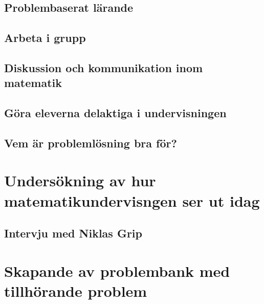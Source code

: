 \documentclass[11pt,a4paper]{article}
\begin{document}
    \subsection{Problembaserat lärande}
        
        
    \subsection{Arbeta i grupp}
        
        
    \subsection{Diskussion och kommunikation inom matematik}
        
        
    \subsection{Göra eleverna delaktiga i undervisningen}
        
        \label{sec:delaktighet}
        
    \subsection{Vem är problemlösning bra för?}
        
    
\section{Undersökning av hur matematikundervisngen ser ut idag}
    
    
    \subsection{Intervju med Niklas Grip}
    
    
\section{Skapande av problembank med tillhörande problem}
\end{document}
